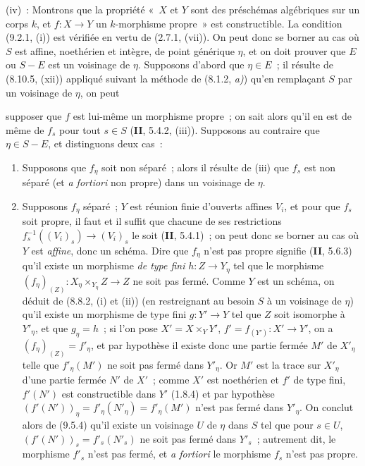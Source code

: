 (iv)~: Montrons que la propriété «~$X$ et $Y$ sont des préschémas algébriques
sur un corps $k$, et $f:X\to Y$ un $k$-morphisme propre~» est constructible. La
condition (9.2.1, (i)) est vérifiée en vertu de (2.7.1, (vii)). On peut donc se
borner au cas où $S$ est affine, noethérien et intègre, de point générique
$\eta$, et on doit prouver que $E$ ou $S-E$ est un voisinage de $\eta$.
Supposons d'abord que $\eta\in E$~; il résulte de (8.10.5, (xii)) appliqué
suivant la méthode de (8.1.2, \emph{a)}) qu'en remplaçant $S$ par un voisinage
de $\eta$, on peut


supposer que $f$ est lui-même un morphisme propre~; on sait alors qu'il en est
de même de $f_s$ pour tout $s\in S$ (\textbf{II}, 5.4.2, (iii)). Supposons au
contraire que $\eta\in S-E$, et distinguons deux cas~:

\begin{enumerate}[label=\upshape{$\arabic{enumi}^\circ$}]
  \item Supposons que $f_\eta$ soit non séparé~; alors il résulte de (iii) que
  $f_s$ est non séparé (et \emph{a fortiori} non propre) dans un voisinage de
  $\eta$.

  \item Supposons $f_\eta$ séparé~; $Y$ est réunion finie d'ouverts affines
  $V_i$, et pour que $f_s$ soit propre, il faut et il suffit que chacune de ses
  restrictions $f_s^{-1}((V_i)_s)\to(V_i)_s$ le soit (\textbf{II}, 5.4.1)~;
  on peut donc se borner au cas où $Y$ est \emph{affine}, donc un schéma. Dire
  que $f_\eta$ n'est pas propre signifie (\textbf{II}, 5.6.3) qu'il existe un
  morphisme \emph{de type fini} $h:Z\to Y_\eta$ tel que le morphisme
  $(f_\eta)_{(Z)}:X_\eta\times_{Y_\eta}Z\to Z$ ne soit pas fermé. Comme $Y$ est
  un schéma, on déduit de (8.8.2, (i) et (ii)) (en restreignant au besoin $S$ à
  un voisinage de $\eta$) qu'il existe un morphisme de type fini $g:Y'\to Y$
  tel que $Z$ soit isomorphe à $Y'_\eta$, et que $g_\eta=h$~; si l'on pose
  $X'=X\times_YY'$, $f'=f_{(Y')}:X'\to Y'$, on a
  $(f_\eta)_{(Z)}=f'_\eta$, et par hypothèse il existe donc une partie fermée
  $M'$ de $X'_\eta$ telle que $f'_\eta(M')$ ne soit pas fermé dans $Y'_\eta$.
  Or $M'$ est la trace sur $X'_\eta$ d'une partie fermée $N'$ de $X'$~; comme
  $X'$ est noethérien et $f'$ de type fini, $f'(N')$ est constructible dans
  $Y'$ (1.8.4) et par hypothèse
  $(f'(N'))_\eta=f'_\eta(N'_\eta)=f'_\eta(M')$ n'est pas fermé dans
  $Y'_\eta$. On conclut alors de (9.5.4) qu'il existe un voisinage $U$ de
  $\eta$ dans $S$ tel que pour $s\in U$,
  $(f'(N'))_s=f'_s(N'_s)$ ne soit pas fermé dans $Y'_s$~; autrement dit, le
  morphisme $f'_s$ n'est pas fermé, et \emph{a fortiori} le morphisme $f_s$
  n'est pas propre.
\end{enumerate}

